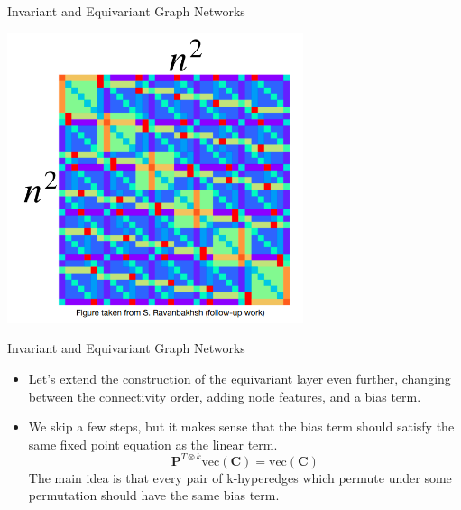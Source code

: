 \documentclass{beamer}
\begin{document}
\begin{frame}{Invariant and Equivariant Graph Networks}
    \begin{center}
        \includegraphics[width=0.65\textwidth]{../figures/2-tensor-eq.png}
    \end{center}
\end{frame}
\begin{frame}{Invariant and Equivariant Graph Networks}
    \begin{itemize}
        \setlength{\itemsep}{\fill}
        \item Let's extend the construction of the equivariant layer even further, changing between the connectivity order, adding node features, and a bias term.
        \pause
        \item We skip a few steps, but it makes sense that the bias term should satisfy the same fixed point equation as the linear term.
        \[ \mathbf{P}^{T \otimes k} \text{vec}(\mathbf{C}) = \text{vec}(\mathbf{C}) \]
        The main idea is that every pair of k-hyperedges which permute under some permutation should have the same bias term.
    \end{itemize}
\end{frame}
\end{document}
